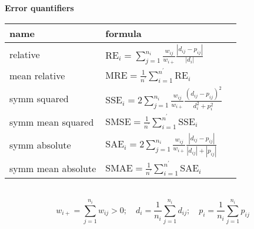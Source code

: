 \documentclass[12pt]{article}\usepackage{a4wide}
\begin{document}
\noindent
\begin{center}
{\large\bf Error quantifiers}\\
\begin{tabular}{lll}\hline
name & formula\\ 
\hline
relative & 
$\mbox{RE}_i = \sum_{j=1}^{n_i} \frac{w_{ij}}{w_{i+}} \frac{|d_{ij} - p_{ij}|}{|d_i|}$\\
	
mean relative & 
$\mbox{MRE} = \frac{1}{n^\prime} \sum_{i=1}^{n^\prime} \mbox{RE}_i$\\
	
symm squared &
$\mbox{SSE}_i = 2 \sum_{j=1}^{n_i} \frac{w_{ij}} {w_{i+}} \frac{(d_{ij} - p_{ij})^2} {d_i^2 + p_i^2}$\\
	
symm mean squared & 
$\mbox{SMSE} = \frac{1}{n^\prime} \sum_{i=1}^{n^\prime} \mbox{SSE}_i$\\

symm absolute & 
$\mbox{SAE}_i = 2 \sum_{j=1}^{n_i} \frac{w_{ij}} {w_{i+}} \frac{|d_{ij} - p_{ij}|} {|d_{ij}| + |p_{ij}|}$\\

symm mean absolute & 
$\mbox{SMAE} = \frac{1}{n^\prime} \sum_{i=1}^{n^\prime} \mbox{SAE}_i$\\
\hline
\end{tabular}\\

\[
  w_{i+} = \sum_{j=1}^{n_i} w_{ij} > 0;  \quad
  d_i = \frac{1}{n_i} \sum_{j=1}^{n_i} d_{ij}; \quad
  p_i = \frac{1}{n_i} \sum_{j=1}^{n_i} p_{ij}
\]
	
\end{center}
\end{document}
